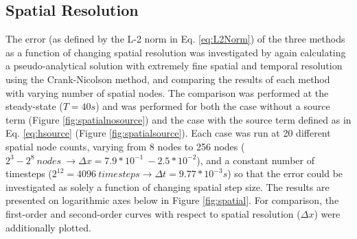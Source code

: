 \documentclass[10pt, letter, showtrims]{extarticle}
\begin{document}
		\pagebreak
		
		\subsection{Spatial Resolution}

		\noindent
		The error (as defined by the L-2 norm in Eq. \ref{eq:L2Norm}) of the three methods as a function of changing spatial resolution was investigated by again calculating a pseudo-analytical solution with extremely fine spatial and temporal resolution using the Crank-Nicolson method, and comparing the results of each method with varying number of spatial nodes. The comparison was performed at the steady-state ($T = 40 s$) and was performed for both the case without a source term (Figure \ref{fig:spatialnosource}) and the case with the source term defined as in Eq. \ref{eq:hsource} (Figure \ref{fig:spatialsource}).	Each case was run at 20 different spatial node counts, varying from 8 nodes to 256 nodes ($2^{3} - 2^{8}\ nodes\ \rightarrow \Delta x = 7.9*10^{-1}\ - 2.5*10^{-2}$), and a constant number of timesteps ($2^{12} = 4096\ timesteps \rightarrow \Delta t = 9.77 * 10^{-3} s$) so that the error could be investigated as solely a function of changing spatial step size. The results are presented on logarithmic axes below in Figure \ref{fig:spatial}. For comparison, the first-order and second-order curves with respect to spatial resolution ($\Delta x$) were additionally plotted.
		
\end{document}
